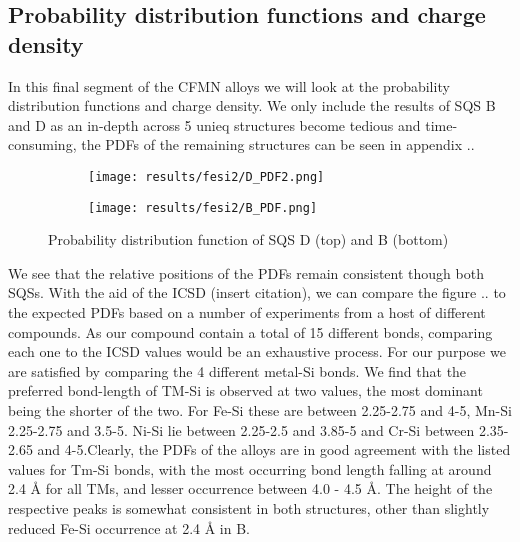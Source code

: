 \subsection{Probability distribution functions and charge density}

In this final segment of the CFMN alloys we will look at the probability distribution functions and charge density. We only include the results of SQS B and D as an in-depth across 5 unieq structures become tedious and time-consuming, the PDFs of the remaining structures can be seen in appendix .. 
 
\begin{figure}[H]
	\centering
	\begin{subfigure}{\textwidth}
		\texttt{[image: results/fesi2/D\_PDF2.png]}
	\end{subfigure}
	\begin{subfigure}{\textwidth}
		\texttt{[image: results/fesi2/B\_PDF.png]}
	\end{subfigure}
	\caption{Probability distribution function of SQS D (top) and B (bottom)}
\end{figure}

We see that the relative positions of the PDFs remain consistent though both SQSs. With the aid of the ICSD (insert citation), we can compare the figure .. to the expected PDFs based on a number of experiments from a host of different compounds. As our compound contain a total of 15 different bonds, comparing each one to the ICSD values would be an exhaustive process. For our purpose we are satisfied by comparing the 4 different metal-Si bonds. We find that the preferred bond-length of TM-Si is observed at two values, the most dominant being the shorter of the two. For Fe-Si these are between 2.25-2.75 and 4-5, Mn-Si 2.25-2.75 and 3.5-5. Ni-Si lie between 2.25-2.5 and 3.85-5 and Cr-Si between 2.35-2.65 and 4-5.Clearly, the PDFs of the alloys are in good agreement with the listed values for Tm-Si bonds, with the most occurring bond length falling at around 2.4 Å for all TMs, and lesser occurrence between 4.0 - 4.5 Å. The height of the respective peaks is somewhat consistent in both structures, other than slightly reduced Fe-Si occurrence at 2.4 Å in B.

